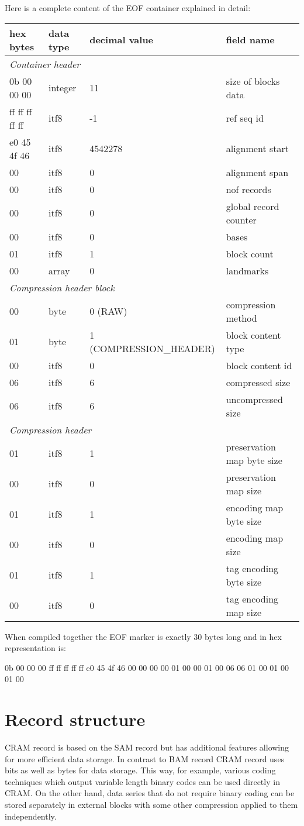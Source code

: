 \documentclass[a4paper]{article}
\begin{document}
Here is a complete content of the EOF container explained in detail:

\begin{tabular}{|l|l|>{\raggedright}p{150pt}|>{\raggedright}p{180pt}|}
\hline
\textbf{hex bytes} & \textbf{data type} & \textbf{decimal value} & \textbf{field 
name}\tabularnewline
\hline
\multicolumn{4}{|l|}{\textit{Container header}}\tabularnewline
\hline
0b 00 00 00 & integer & 11 & size of blocks data\tabularnewline
\hline
ff ff ff ff ff & itf8 & -1 & ref seq id\tabularnewline
\hline
e0 45 4f 46 & itf8 & 4542278 & alignment start\tabularnewline
\hline
00 & itf8 & 0 & alignment span\tabularnewline
\hline
00 & itf8 & 0 & nof records\tabularnewline
\hline
00 & itf8 & 0 & global record counter\tabularnewline
\hline
00 & itf8 & 0 & bases\tabularnewline
\hline
01 & itf8 & 1 & block count\tabularnewline
\hline
00 & array & 0 & landmarks\tabularnewline
\hline
\multicolumn{4}{|l|}{\textit{Compression header block}}\tabularnewline
\hline
00 & byte & 0 (RAW) & compression method\tabularnewline
\hline
01 & byte & 1 (COMPRESSION\_HEADER) & block content type\tabularnewline
\hline
00 & itf8 & 0 & block content id\tabularnewline
\hline
06 & itf8 & 6 & compressed size\tabularnewline
\hline
06 & itf8 & 6 & uncompressed size\tabularnewline
\hline
\multicolumn{4}{|l|}{\textit{Compression header}}\tabularnewline
\hline
01 & itf8 & 1 & preservation map byte size\tabularnewline
\hline
00 & itf8 & 0 & preservation map size\tabularnewline
\hline
01 & itf8 & 1 & encoding map byte size\tabularnewline
\hline
00 & itf8 & 0 & encoding map size\tabularnewline
\hline
01 & itf8 & 1 & tag encoding byte size\tabularnewline
\hline
00 & itf8 & 0 & tag encoding map size\tabularnewline
\hline
\end{tabular}

When compiled together the EOF marker is exactly 30 bytes long and in hex representation 
is:

0b 00 00 00 ff ff ff ff ff e0 45 4f 46 00 00 00 00 01 00  00 01 00 06 06 01 00 
01 00 01 00

\section{\textbf{Record structure}}

CRAM record is based on the SAM record but has additional features allowing for 
more efficient data storage.  In contrast to BAM record CRAM record uses bits as 
well as bytes for data storage. This way, for example, various coding techniques 
which output variable length binary codes can be used directly in CRAM. On the 
other hand, data series that do not require binary coding can be stored separately 
in external blocks with some other compression applied to them independently.
\end{document}
